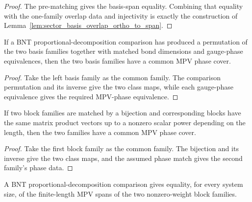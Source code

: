 \begin{proof}
	\leanok
	The pre-matching gives the basis-span equality. Combining that equality with
	the one-family overlap data and injectivity is exactly the construction of
	Lemma~\ref{lem:sector_basis_overlap_ortho_to_span}.
\end{proof}

\begin{lemma}%
\label{lem:common_phase_cover_of_proportional_decomposition}
	\leanok
	If a BNT proportional-decomposition comparison has produced a permutation of
	the two basis families together with matched bond dimensions and gauge-phase
	equivalences, then the two basis families have a common MPV phase cover.
\end{lemma}

\begin{proof}
	\leanok
	Take the left basis family as the common family. The comparison permutation and
	its inverse give the two class maps, while each gauge-phase equivalence gives
	the required MPV-phase equivalence.
\end{proof}

\begin{lemma}%
\label{lem:common_phase_cover_of_equiv_phase}
	\leanok
	If two block families are matched by a bijection and corresponding blocks have
	the same matrix product vectors up to a nonzero scalar power depending on the
	length, then the two families have a common MPV phase cover.
\end{lemma}

\begin{proof}
	\leanok
	Take the first block family as the common family. The bijection and its inverse
	give the two class maps, and the assumed phase match gives the second
	family's phase data.
\end{proof}

\begin{lemma}%
\label{lem:nonzero_block_span_eq_of_proportional_decomposition}
	\leanok
	A BNT proportional-decomposition comparison gives equality, for every system
	size, of the finite-length MPV spans of the two nonzero-weight block families.
\end{lemma}

